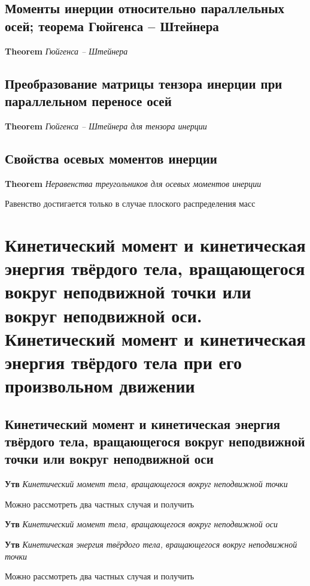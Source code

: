 \documentclass[a4paper, 14pt]{article}
\begin{document}
    \subsection{Моменты инерции относительно параллельных осей; теорема Гюйгенса – Штейнера}
    
    \textbf{Theorem} \textit{Гюйгенса – Штейнера}
    
    \subsection{Преобразование матрицы тензора инерции при параллельном переносе осей}
    
    \textbf{Theorem} \textit{Гюйгенса – Штейнера для тензора инерции}
    
    \subsection{Свойства осевых моментов инерции}
    
    \textbf{Theorem} \textit{Неравенства треугольников для осевых моментов инерции}
    
    Равенство достигается только в случае плоского распределения масс
    
    \section{Кинетический момент и кинетическая энергия твёрдого тела, вращающегося вокруг неподвижной точки или
    вокруг неподвижной оси.
    Кинетический момент и кинетическая энергия твёрдого тела при его произвольном движении}
    
    \subsection{Кинетический момент и кинетическая энергия твёрдого тела, вращающегося вокруг неподвижной точки или
    вокруг неподвижной оси}
    
    \textbf{Утв} \textit{Кинетический момент тела, вращающегося вокруг неподвижной точки}
    
    Можно рассмотреть два частных случая и получить
    
    \textbf{Утв} \textit{Кинетический момент тела, вращающегося вокруг неподвижной оси}
    
    \textbf{Утв} \textit{Кинетическая энергия твёрдого тела, вращающегося вокруг неподвижной точки}
    
    Можно рассмотреть два частных случая и получить
    
\end{document}
